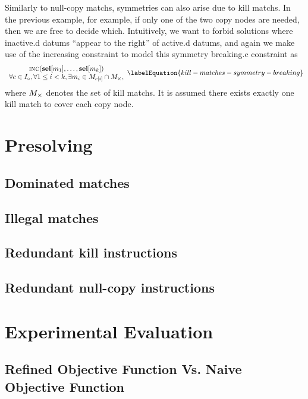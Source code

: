 Similarly to \glspl{null-copy match}, symmetries can also arise due to
\glspl{kill match}.
%
In the previous example, for example, if only one of the two \glspl{copy node}
are needed, then we are free to decide which.
%
Intuitively, we want to forbid \glspl{solution} where \gls{inactive.d}
\glspl{datum} ``appear to the right'' of \gls{active.d} \glspl{datum}, and again
we make use of the \gls{increasing constraint} to model this \gls{symmetry
  breaking.c} \gls{constraint} as
%
\begin{equation}
  \begin{array}{c}
    \mIncreasing(\mVar{sel}[m_1], \ldots, \mVar{sel}[m_k]) \\
    \forall c \in \mInterchDataSet[\mCopy],
    \forall 1 \leq i < k,
    \exists m_i \in \mMatchSet[c[i]] \cap \mKillMatchSet,
  \end{array}
  \labelEquation{kill-matches-symmetry-breaking}
\end{equation}
%
where $\mKillMatchSet$ denotes the set of \glspl{kill match}.
%
It is assumed there exists exactly one \gls{kill match} to cover each \gls{copy
  node}.


\section{Presolving}

\subsection{Dominated matches}
\subsection{Illegal matches}
\subsection{Redundant kill instructions}
\subsection{Redundant null-copy instructions}


\section{Experimental Evaluation}
\subsection{Refined Objective Function Vs. Naive Objective Function}
